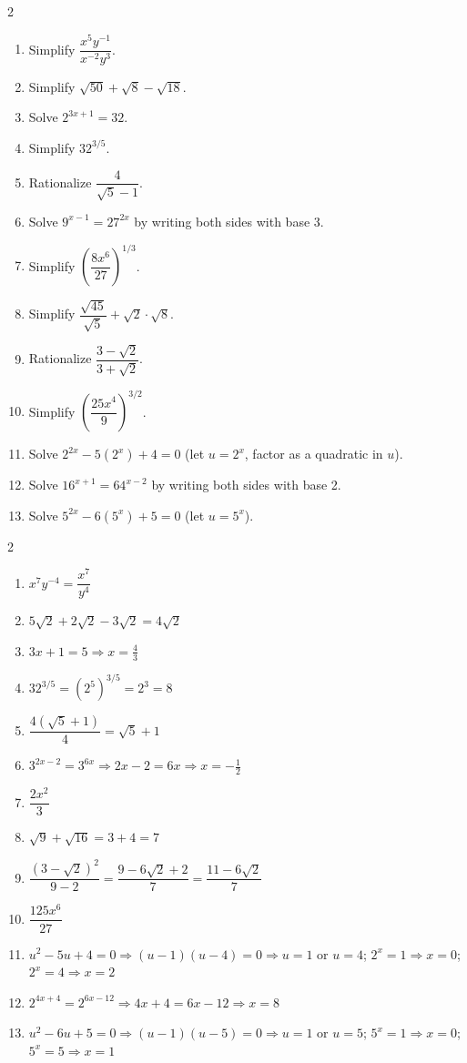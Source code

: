 \documentclass[11pt]{article}
\begin{document}
\begin{recapbox}
\begin{multicols}{2}
\small
\begin{enumerate}[leftmargin=*,itemsep=3pt]
  \item Simplify $\dfrac{x^5y^{-1}}{x^{-2}y^3}$.
  \item Simplify $\sqrt{50}+\sqrt{8}-\sqrt{18}$.
  \item Solve $2^{3x+1}=32$.
  \item Simplify $32^{3/5}$.
  \item Rationalize $\dfrac{4}{\sqrt5-1}$.
  \item Solve $9^{x-1}=27^{2x}$ by writing both sides with base 3.
  \item Simplify $\left(\dfrac{8x^6}{27}\right)^{1/3}$.
  \item Simplify $\dfrac{\sqrt{45}}{\sqrt5}+\sqrt{2}\cdot\sqrt{8}$.
  \item Rationalize $\dfrac{3-\sqrt2}{3+\sqrt2}$.
  \item Simplify $\left(\dfrac{25x^4}{9}\right)^{3/2}$.
  \item Solve $2^{2x}-5(2^x)+4=0$ (let $u=2^x$, factor as a quadratic in $u$).
  \item Solve $16^{x+1}=64^{x-2}$ by writing both sides with base 2.
  \item Solve $5^{2x}-6(5^x)+5=0$ (let $u=5^x$).
\end{enumerate}
\end{multicols}
\end{recapbox}

\begin{keybox}
\begin{multicols}{2}
\small
\begin{enumerate}[leftmargin=*,itemsep=3pt]
  \item $x^7y^{-4}=\dfrac{x^7}{y^4}$
  \item $5\sqrt2+2\sqrt2-3\sqrt2=4\sqrt2$
  \item $3x+1=5\Rightarrow x=\tfrac43$
  \item $32^{3/5}=(2^5)^{3/5}=2^3=8$
  \item $\dfrac{4(\sqrt5+1)}{4}=\sqrt5+1$
  \item $3^{2x-2}=3^{6x}\Rightarrow2x-2=6x\Rightarrow x=-\tfrac12$
  \item $\dfrac{2x^2}{3}$
  \item $\sqrt9+\sqrt{16}=3+4=7$
  \item $\dfrac{(3-\sqrt2)^2}{9-2}=\dfrac{9-6\sqrt2+2}{7}=\dfrac{11-6\sqrt2}{7}$
  \item $\dfrac{125x^6}{27}$
  \item $u^2-5u+4=0\Rightarrow(u-1)(u-4)=0\Rightarrow u=1$ or $u=4$; $2^x=1\Rightarrow x=0$; $2^x=4\Rightarrow x=2$
  \item $2^{4x+4}=2^{6x-12}\Rightarrow4x+4=6x-12\Rightarrow x=8$
  \item $u^2-6u+5=0\Rightarrow(u-1)(u-5)=0\Rightarrow u=1$ or $u=5$; $5^x=1\Rightarrow x=0$; $5^x=5\Rightarrow x=1$
\end{enumerate}
\end{multicols}
\end{keybox}
\end{document}
